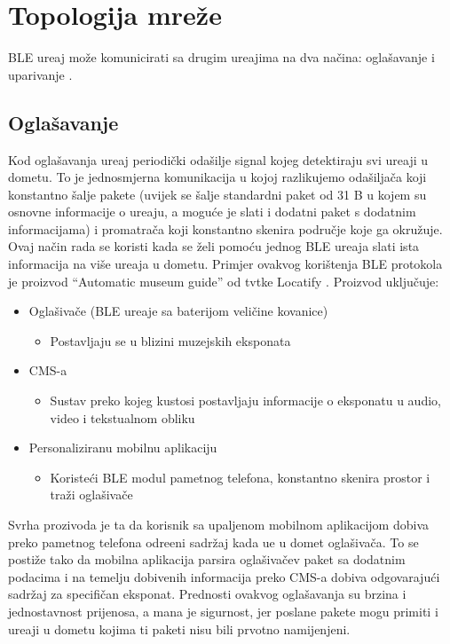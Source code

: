 \section{Topologija mre\v{z}e}

BLE ure\dj aj mo\v{z}e komunicirati sa drugim ure\dj ajima na dva na\v{c}ina: ogla\v{s}avanje i uparivanje \cite{ble_getting_started}.

\subsection{Ogla\v{s}avanje}

Kod ogla\v{s}avanja ure\dj aj periodi\v{c}ki oda\v{s}ilje signal kojeg detektiraju svi ure\dj aji u dometu. To je jednosmjerna komunikacija u kojoj razlikujemo oda\v{s}ilja\v{c}a koji konstantno \v{s}alje pakete (uvijek se \v{s}alje standardni paket od 31 B u kojem su osnovne informacije o ure\dj aju, a mogu\'{c}e je slati i dodatni paket s dodatnim informacijama) i promatra\v{c}a koji konstantno skenira podru\v{c}je koje ga okru\v{z}uje. Ovaj na\v{c}in rada se koristi kada se \v{z}eli pomo\'{c}u jednog BLE ure\dj aja slati ista informacija na vi\v{s}e ure\dj aja u dometu. Primjer ovakvog kori\v{s}tenja BLE protokola je proizvod ``Automatic museum guide'' od tvtke Locatify \cite{automatic_museum_guide} . Proizvod uklju\v{c}uje:


\begin{itemize}
	\item Ogla\v{s}iva\v{c}e (BLE ure\dj aje sa baterijom veli\v{c}ine kovanice)
	\begin{itemize}
		\item Postavljaju se u blizini muzejskih eksponata
	\end{itemize}
	\item CMS-a
	\begin{itemize}
		\item Sustav preko kojeg kustosi postavljaju informacije o eksponatu u audio, video i tekstualnom obliku
	\end{itemize}
	
	\item Personaliziranu mobilnu aplikaciju
	\begin{itemize}
		\item Koriste\'{c}i BLE modul pametnog telefona, konstantno skenira prostor i tra\v{z}i ogla\v{s}iva\v{c}e
	\end{itemize}
\end{itemize}

Svrha prozivoda je ta da korisnik sa upaljenom mobilnom aplikacijom dobiva preko pametnog telefona odre\dj eni sadr\v{z}aj kada u\dj e u domet ogla\v{s}iva\v{c}a. To se posti\v{z}e tako da mobilna aplikacija parsira ogla\v{s}iva\v{c}ev paket sa dodatnim podacima i na temelju dobivenih informacija preko CMS-a dobiva odgovaraju\'{c}i sadr\v{z}aj za specifi\v{c}an eksponat.
Prednosti ovakvog ogla\v{s}avanja su brzina i jednostavnost prijenosa, a mana je sigurnost, jer poslane pakete mogu primiti i ure\dj aji u dometu kojima ti paketi nisu bili prvotno namijenjeni.


